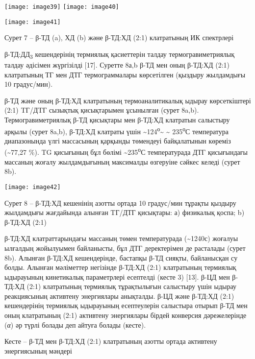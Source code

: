 \texttt{[image: image39]}
\texttt{[image: image40]}

\texttt{[image: image41]}

Сурет 7 -- β-ТД (a), ХД (b) және β-ТД:ХД (2:1) клатратының ИК спектрлері

β-ТД:ДД\textsubscript{3} кешендерінің термиялық қасиеттерін талдау
термогравиметриялық талдау әдісімен жүргізілді {[}17{]}. Суретте 8а,b
β-ТД мен оның β-ТД:ХД (2:1) клатратының ТГ мен ДТГ термограммалары
көрсетілген (қыздыру жылдамдығы 10 градус/мин).

β-ТД және оның β-ТД:ХД клатратының термоаналитикалық ыдырау
көрсеткіштері (2:1) TГ/ДTГ сызықтық қисықтарымен ұсынылған (сурет 8a,b).
Термогравиметриялық β-ТД қисықтары мен β-ТД:ХД клатратын салыстыру
арқылы (сурет 8a,b), β-ТД:ХД клатраты үшін
\textasciitilde124\textsuperscript{о}\textasciitilde{} \textasciitilde{}
235\textsuperscript{о}С температура диапазонында үлгі массасының
қарқынды төмендеуі байқалатынын көреміз (\textasciitilde77,27 \%). TG
қисығының бұл бөлімі \textasciitilde235\textsuperscript{о}С
температурада ДТГ қисығындағы массаның жоғалу жылдамдығының максималды
өзгеруіне сәйкес келеді (сурет 8b).

\texttt{[image: image42]}

Сурет 8 -- β-ТД:ХД кешенінің азотты ортада 10 градус/мин тұрақты қыздыру
жылдамдығы жағдайында алынған TГ/ДТГ қисықтары: а) физикалық қоспа; b)
β-ТД:ХД (2:1)

β-ТД:ХД клатраттарындағы массаның төмен температурада
(\textasciitilde1240с) жоғалуы ылғалдың жойылуымен байланысты, бұл ДТГ
деректерімен де расталады (сурет 8b). Алынған β-ТД:ХД кешендерінде,
бастапқы β-ТД сияқты, байланысқан су болды. Алынған мәліметтер негізінде
β-ТД:ХД (2:1) клатратының термиялық ыдырауының кинетикалық параметрлері
есептелді (кесте 3) {[}13{]}. β-ЦД мен β-ТД:ХД (2:1) клатратының
термиялық тұрақтылығын салыстыру үшін ыдырау реакциясының активтену
энергиялары анықталды. β-ЦД және β-ТД:ХД (2:1) кешендерінің термиялық
ыдырауының есептеулерін салыстыра отырып β-ТД мен оның клатратының (2:1)
активтену энергиялары бірдей конверсия дәрежелерінде (\emph{α}) әр түрлі
болады деп айтуға болады (кесте).

Кесте -- β-ТД мен β-ТД:ХД (2:1) клатратының азотты ортада активтену
энергиясының мәндері

